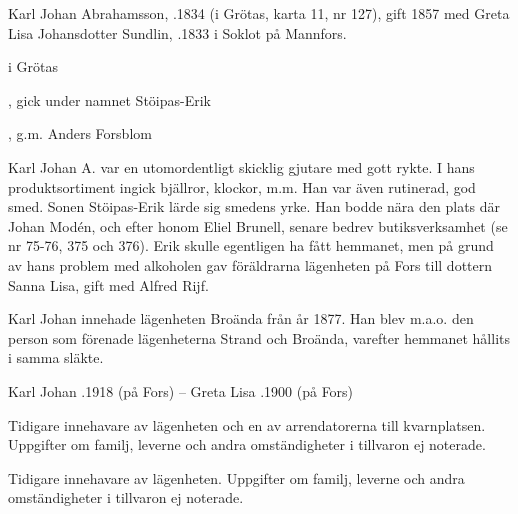 
Karl Johan Abrahamsson, .1834 (i Grötas, karta 11, nr 127), gift 1857 med Greta Lisa Johansdotter Sundlin, .1833 i Soklot på Mannfors.

\begin{jhchildren}
  \item {} i Grötas
  \item {}
  \item {}, gick under namnet Stöipas-Erik
  \item {}
  \item {}
  \item {}, g.m. Anders Forsblom
\end{jhchildren}

Karl Johan A. var en utomordentligt skicklig gjutare med gott rykte. I hans produktsortiment ingick bjällror, klockor, m.m. Han var även rutinerad, god smed. Sonen Stöipas-Erik lärde sig smedens yrke. Han bodde nära den plats där Johan Modén, och efter honom Eliel Brunell, senare bedrev butiksverksamhet (se nr 75-76, 375 och 376). Erik skulle egentligen ha fått hemmanet, men på grund av hans problem med alkoholen gav föräldrarna lägenheten på Fors till dottern Sanna Lisa, gift med Alfred Rijf.

Karl Johan innehade lägenheten Broända från år 1877. Han blev m.a.o. den person som förenade lägenheterna Strand och Broända, varefter hemmanet hållits i samma släkte.

Karl Johan .1918 (på Fors)   --    Greta Lisa .1900 (på Fors)




Tidigare innehavare av lägenheten och en av arrendatorerna till kvarnplatsen. Uppgifter om familj, leverne och andra omständigheter i tillvaron ej noterade.



Tidigare innehavare av lägenheten. Uppgifter om familj, leverne och andra omständigheter i tillvaron ej noterade.


